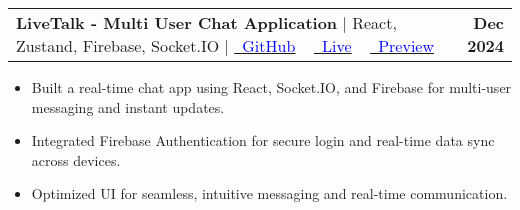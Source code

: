 \documentclass[letterpaper,11pt]{article}
\makeatletter
\newcommand{\resumeItem}[1]{
  \item\small{
    {#1 \vspace{-2pt}}
  }
}
\newcommand{\resumeProjectHeading}[2]{
    \item
    \begin{tabular*}{1.001\textwidth}{l@{\extracolsep{\fill}}r}
      \small#1 & \textbf{\small #2}\\
    \end{tabular*}\vspace{-7pt}
}
\newcommand{\resumeItemListStart}{\begin{itemize}}
\newcommand{\resumeItemListEnd}{\end{itemize}\vspace{-5pt}}
\makeatother
\begin{document}
          
      \resumeProjectHeading
          {\textbf{LiveTalk - Multi User Chat Application} $|$ {React, Zustand, Firebase, Socket.IO } $|$ {
          \href{https://github.com/s-satyajit/multi-user-chatApp}{\raisebox{-0.\height}\faGithub\ \underline{\textcolor{blue}{GitHub}}} ~ 
          \href{https://multi-user-chat.vercel.app/}{\raisebox{-0.\height}\faLaptopCode\ \underline{\textcolor{blue}{Live}}}} ~
          \href{https://www.linkedin.com/feed/update/urn:li:activity:7271581170591502339/}{\raisebox{-0.\height}\faLaptop\ \underline{\textcolor{blue}{Preview}}}
          }
          {Dec 2024}
          \resumeItemListStart
            \resumeItem{Built a real-time chat app using React, Socket.IO, and Firebase for multi-user messaging and instant updates.}
            \resumeItem{Integrated Firebase Authentication for secure login and real-time data sync across devices.}
            \resumeItem{Optimized UI for seamless, intuitive messaging and real-time communication.}
          \resumeItemListEnd 
          \vspace{-13pt}
          
          
\end{document}
